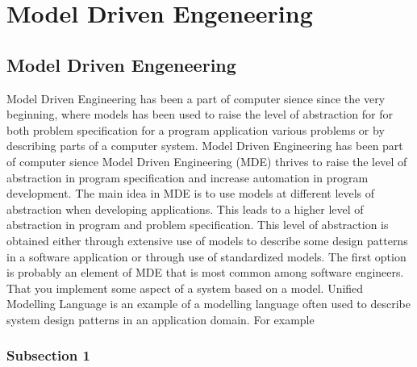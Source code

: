 
\chapter{Model Driven Engeneering} %

\label{Chapter2} %



\section{Model Driven Engeneering}

Model Driven Engineering has been a part of computer sience since the very
beginning, where models has been used to raise the level of abstraction for for
both problem specification for a program application  various problems or by
describing parts of a computer system.
Model Driven Engineering has been part of computer sience Model Driven
Engineering (MDE)\cite{France2007} thrives to raise the level of abstraction in
program specification and increase automation in program development. The main
idea in MDE is to use models at different levels of abstraction when developing
applications. This leads to a higher level of abstraction in program and
problem specification. This level of abstraction is obtained either through
extensive use of models to describe some design patterns in a software
application or through use of standardized models. The first option is probably
an element of MDE that is most common among software engineers. That you
implement some aspect of a system based on a model. Unified Modelling
Language\cite{UML} is an example of a modelling language often used to describe
system design patterns in an application domain. For example 

\subsection{Subsection 1}


